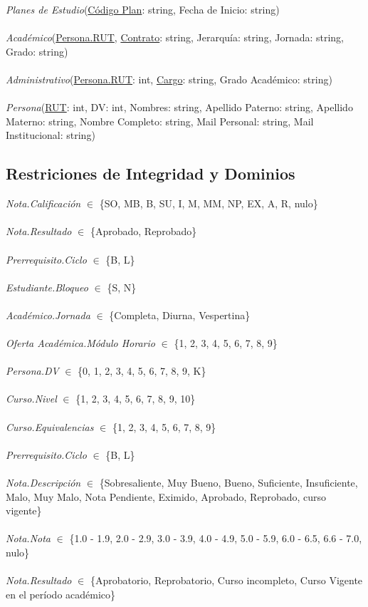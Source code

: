\documentclass[12pt]{article}
\begin{document}
\textit{Planes de Estudio}(\underline{Código Plan}: string, Fecha de Inicio: string)\\\\
\textit{Académico}(\underline{Persona.RUT}, \underline{Contrato}: string, Jerarquía: string, Jornada: string, Grado: string)\\\\
\textit{Administrativo}(\underline{Persona.RUT}: int, \underline{Cargo}: string, Grado Académico: string)\\\\
\textit{Persona}(\underline{RUT}: int, DV: int, Nombres: string, Apellido Paterno: string, Apellido Materno: string, Nombre Completo: string, Mail Personal: string, Mail Institucional: string)

\subsection*{Restriciones de Integridad y Dominios}
\textit{Nota.Calificación} $\in$ \{SO, MB, B, SU, I, M, MM, NP, EX, A, R, nulo\}\\\\\textit{Nota.Resultado} $\in$ \{Aprobado, Reprobado\}\\\\
\textit{Prerrequisito.Ciclo} $\in$ \{B, L\}\\\\
\textit{Estudiante.Bloqueo} $\in$ \{S, N\}\\\\
\textit{Académico.Jornada} $\in$ \{Completa, Diurna, Vespertina\}\\\\
\textit{Oferta Académica.Módulo Horario} $\in$ \{1, 2, 3, 4, 5, 6, 7, 8, 9\}\\\\
\textit{Persona.DV} $\in$ \{0, 1, 2, 3, 4, 5, 6, 7, 8, 9, K\}\\\\
\textit{Curso.Nivel} $\in$ \{1, 2, 3, 4, 5, 6, 7, 8, 9, 10\}\\\\
\textit{Curso.Equivalencias} $\in$ \{1, 2, 3, 4, 5, 6, 7, 8, 9\}\\\\
\textit{Prerrequisito.Ciclo} $\in$ \{B, L\}\\\\
\textit{Nota.Descripción} $\in$ \{Sobresaliente, Muy Bueno, Bueno, Suficiente, Insuficiente, Malo, Muy Malo, Nota Pendiente, Eximido, Aprobado, Reprobado, curso vigente\}\\\\
\textit{Nota.Nota} $\in$ \{1.0 - 1.9, 2.0 - 2.9, 3.0 - 3.9, 4.0 - 4.9, 5.0 - 5.9, 6.0 - 6.5, 6.6 - 7.0, nulo\}\\\\
\textit{Nota.Resultado} $\in$ \{Aprobatorio, Reprobatorio, Curso incompleto, Curso Vigente en el período académico\}
\end{document}
